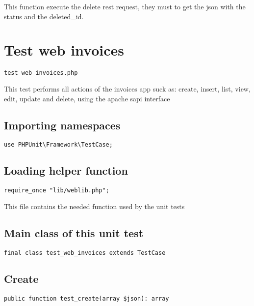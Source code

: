 \documentclass[a4paper]{book}
\begin{document}
This function execute the delete rest request, they must to get the json
with the status and the deleted\_id.

\hypertarget{toc66}{}
\section{Test web invoices}

\begin{lstlisting}
test_web_invoices.php
\end{lstlisting}

This test performs all actions of the invoices app suck as: create, insert,
list, view, edit, update and delete, using the apache sapi interface

\hypertarget{toc67}{}
\subsection{Importing namespaces}

\begin{lstlisting}
use PHPUnit\Framework\TestCase;
\end{lstlisting}

\hypertarget{toc68}{}
\subsection{Loading helper function}

\begin{lstlisting}
require_once "lib/weblib.php";
\end{lstlisting}

This file contains the needed function used by the unit tests

\hypertarget{toc69}{}
\subsection{Main class of this unit test}

\begin{lstlisting}
final class test_web_invoices extends TestCase
\end{lstlisting}

\hypertarget{toc70}{}
\subsection{Create}

\begin{lstlisting}
public function test_create(array $json): array
\end{lstlisting}
\end{document}
